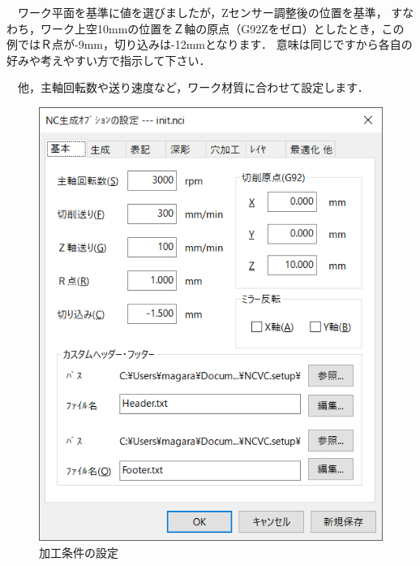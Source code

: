 　ワーク平面を基準に値を選びましたが，Zセンサー調整後の位置を基準，
すなわち，ワーク上空10mmの位置をＺ軸の原点（G92Zをゼロ）としたとき，この例ではＲ点が-9mm，切り込みは-12mmとなります．
意味は同じですから各自の好みや考えやすい方で指示して下さい．

　他，主軸回転数や送り速度など，ワーク材質に合わせて設定します．

\begin{minipage}{0.5\textwidth}
\begin{figure}[H]
\centering
\includegraphics[scale=0.7]{No2/fig/init.nci.png}
\caption{加工条件の設定}
\label{fig:init.nci.png}
\end{figure}
\end{minipage}
